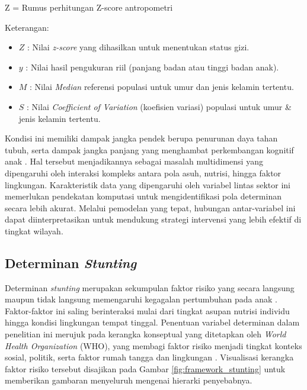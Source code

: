 \begin{equationcaptioned}[eq:zscore]{
    Z = 
}{
    Rumus perhitungan Z-score antropometri
}
\end{equationcaptioned}

\noindent Keterangan:
\begin{itemize}
    \item $Z$ : Nilai \textit{z-score} yang dihasilkan untuk menentukan status gizi.
    \item $y$ : Nilai hasil pengukuran riil (panjang badan atau tinggi badan anak).
    \item $M$ : Nilai \textit{Median} referensi populasi untuk umur dan jenis kelamin tertentu.
    \item $S$ : Nilai \textit{Coefficient of Variation} (koefisien variasi) populasi untuk umur \& jenis kelamin tertentu.
\end{itemize}

Kondisi ini memiliki dampak jangka pendek berupa penurunan daya tahan tubuh, serta dampak jangka panjang yang menghambat perkembangan kognitif anak \cite{bkkbn2021ran}. Hal tersebut menjadikannya sebagai masalah multidimensi yang dipengaruhi oleh interaksi kompleks antara pola asuh, nutrisi, hingga faktor lingkungan. Karakteristik data yang dipengaruhi oleh variabel lintas sektor ini memerlukan pendekatan komputasi untuk mengidentifikasi pola determinan secara lebih akurat. Melalui pemodelan yang tepat, hubungan antar-variabel ini dapat diinterpretasikan untuk mendukung strategi intervensi yang lebih efektif di tingkat wilayah.

\subsection{Determinan \textit{Stunting}}

Determinan \textit{stunting} merupakan sekumpulan faktor risiko yang secara langsung maupun tidak langsung memengaruhi kegagalan pertumbuhan pada anak \cite{who_stunting_framework_2013}. Faktor-faktor ini saling berinteraksi mulai dari tingkat asupan nutrisi individu hingga kondisi lingkungan tempat tinggal. Penentuan variabel determinan dalam penelitian ini merujuk pada kerangka konseptual yang ditetapkan oleh \textit{World Health Organization} (WHO), yang membagi faktor risiko menjadi tingkat konteks sosial, politik, serta faktor rumah tangga dan lingkungan \cite{who_stunting_framework_2013}. Visualisasi kerangka faktor risiko tersebut disajikan pada Gambar \ref{fig:framework_stunting} untuk memberikan gambaran menyeluruh mengenai hierarki penyebabnya.


